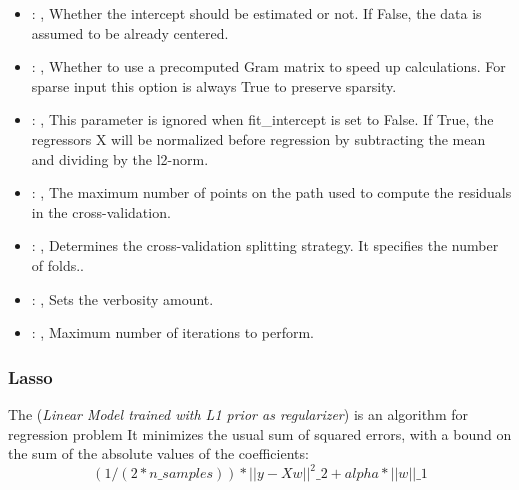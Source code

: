 \begin{itemize}
    \item {}: , 
      Whether the intercept should be estimated or not. If False,
      the data is assumed to be already centered.

    \item {}: , 
      Whether to use a precomputed Gram matrix to speed up calculations.
      For sparse input this option is always True to preserve sparsity.

    \item {}: , 
      This parameter is ignored when fit\_intercept is set to False. If True,
      the regressors X will be normalized before regression by subtracting the mean and
      dividing by the l2-norm.

    \item {}: , 
      The maximum number of points on the path used to compute the
      residuals in the cross-validation.

    \item {}: , 
      Determines the cross-validation splitting strategy.
      It specifies the number of folds..

    \item {}: , 
      Sets the verbosity amount.

    \item {}: , 
      Maximum number of iterations to perform.
  \end{itemize}


\subsubsection{Lasso}
  The  (\textit{Linear Model trained with L1 prior as regularizer})
  is an algorithm for regression problem                         It minimizes the usual sum of
  squared errors, with a bound on the sum of the                         absolute values of the
  coefficients:                         \begin{equation}                          (1 / (2 *
  n\_samples)) * ||y - Xw||^2\_2 + alpha * ||w||\_1                         \end{equation}

